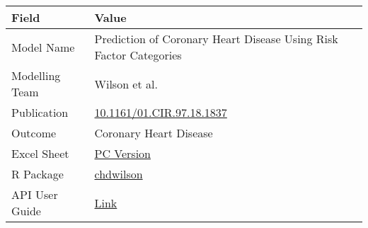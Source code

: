 \documentclass[
]{book}
\begin{document}
\begin{longtable}[]{@{}ll@{}}
\toprule
\begin{minipage}[b]{0.45\columnwidth}\raggedright
Field\strut
\end{minipage} & \begin{minipage}[b]{0.49\columnwidth}\raggedright
Value\strut
\end{minipage}\tabularnewline
\midrule
\endhead
\begin{minipage}[t]{0.45\columnwidth}\raggedright
Model Name\strut
\end{minipage} & \begin{minipage}[t]{0.49\columnwidth}\raggedright
Prediction of Coronary Heart Disease Using Risk Factor Categories\strut
\end{minipage}\tabularnewline
\begin{minipage}[t]{0.45\columnwidth}\raggedright
Modelling Team\strut
\end{minipage} & \begin{minipage}[t]{0.49\columnwidth}\raggedright
Wilson et al.\strut
\end{minipage}\tabularnewline
\begin{minipage}[t]{0.45\columnwidth}\raggedright
Publication\strut
\end{minipage} & \begin{minipage}[t]{0.49\columnwidth}\raggedright
\href{https://doi.org/10.1161/01.CIR.97.18.1837}{10.1161/01.CIR.97.18.1837}\strut
\end{minipage}\tabularnewline
\begin{minipage}[t]{0.45\columnwidth}\raggedright
Outcome\strut
\end{minipage} & \begin{minipage}[t]{0.49\columnwidth}\raggedright
Coronary Heart Disease\strut
\end{minipage}\tabularnewline
\begin{minipage}[t]{0.45\columnwidth}\raggedright
Excel Sheet\strut
\end{minipage} & \begin{minipage}[t]{0.49\columnwidth}\raggedright
\href{https://drive.google.com/uc?export=download\&id=18RcG1yHeobxNw7T7m_dnF_5VDIz1ty--}{PC Version}\strut
\end{minipage}\tabularnewline
\begin{minipage}[t]{0.45\columnwidth}\raggedright
R Package\strut
\end{minipage} & \begin{minipage}[t]{0.49\columnwidth}\raggedright
\href{https://github.com/resplab/chdwilson}{chdwilson}\strut
\end{minipage}\tabularnewline
\begin{minipage}[t]{0.45\columnwidth}\raggedright
API User Guide\strut
\end{minipage} & \begin{minipage}[t]{0.49\columnwidth}\raggedright
\href{https://resplab.github.io/prismguide/api-users-guide.html\#chdwilson}{Link}\strut
\end{minipage}\tabularnewline
\bottomrule
\end{longtable}
\end{document}
